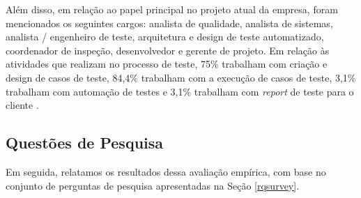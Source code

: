 Além disso, em relação ao papel principal no projeto atual da empresa, foram mencionados os seguintes cargos: analista de qualidade, analista de sistemas, analista / engenheiro de teste, arquitetura e design de teste automatizado, coordenador de inspeção, desenvolvedor e gerente de projeto. Em relação às atividades que realizam no processo de teste, 75\% trabalham com criação e design de casos de teste, 84,4\% trabalham com a execução de casos de teste, 3,1\% trabalham com automação de testes e 3,1\% trabalham com \textit{report} de teste para o cliente .

\subsection{Questões de Pesquisa}

Em seguida, relatamos os resultados dessa avaliação empírica, com base no conjunto de perguntas de pesquisa apresentadas na Seção \ref{rqsurvey}.

